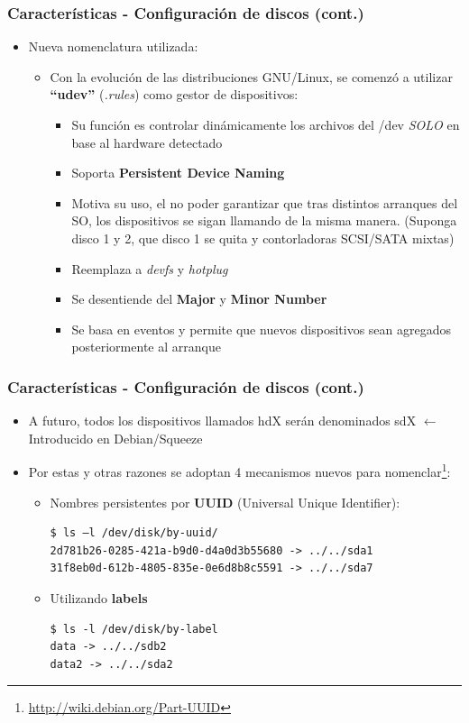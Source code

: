\begin{frame}
  \frametitle{Características - Configuración de discos (cont.)}
  \begin{itemize}
	  \item Nueva nomenclatura utilizada:
	  \begin{itemize}
	  	\item Con la evolución de las distribuciones GNU/Linux, se comenzó a utilizar \textbf{``udev''} (\textit{.rules}) como gestor de dispositivos:
	  	\begin{itemize}
		  	\item Su función es controlar dinámicamente los archivos del /dev \textit{SOLO} en base al hardware detectado
		  	\item Soporta \textbf{Persistent Device Naming}
		  	\item Motiva su uso, el no poder garantizar que tras distintos arranques del SO, los dispositivos se sigan llamando de la misma manera. (Suponga disco 1 y 2, que disco 1 se quita y contorladoras SCSI/SATA mixtas)
		  	\item Reemplaza a \textit{devfs} y \textit{hotplug}
		  	\item Se desentiende del \textbf{Major} y \textbf{Minor Number}
		  	\item Se basa en eventos y permite que nuevos dispositivos sean agregados posteriormente al arranque
	  	\end{itemize}
	  \end{itemize}
  \end{itemize}
\end{frame}

\begin{frame}[fragile]
  \frametitle{Características - Configuración de discos (cont.)}
  \begin{itemize}
	  \item A futuro, todos los dispositivos llamados hdX serán denominados sdX $\leftarrow$ Introducido en Debian/Squeeze
	  \item Por estas y otras razones se adoptan 4 mecanismos nuevos para nomenclar\footnote{\url{http://wiki.debian.org/Part-UUID}}:
	  \begin{itemize}
	  	\item Nombres persistentes por \textbf{UUID} (\small{Universal Unique Identifier}):
	  	\begin{lstlisting}
$ ls –l /dev/disk/by-uuid/
2d781b26-0285-421a-b9d0-d4a0d3b55680 -> ../../sda1
31f8eb0d-612b-4805-835e-0e6d8b8c5591 -> ../../sda7
		\end{lstlisting}
		\item Utilizando \textbf{labels}
		\begin{lstlisting}
$ ls -l /dev/disk/by-label
data -> ../../sdb2
data2 -> ../../sda2
		\end{lstlisting}
	  \end{itemize}
  \end{itemize}
\end{frame}

